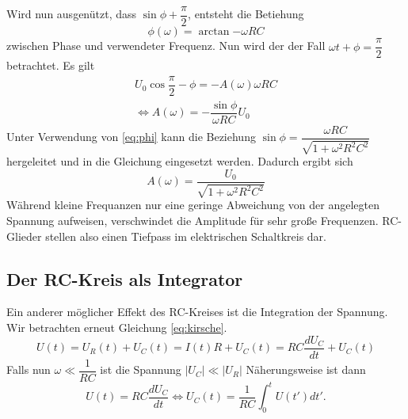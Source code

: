     Wird nun ausgenützt, dass $\sin{\phi + \dfrac{\pi}{2}}$, entsteht die Betiehung
    \begin{equation}
        \label{eq:phi}
        \phi(\omega)=\arctan{-\omega RC}
    \end{equation}
    zwischen Phase und verwendeter Frequenz. Nun wird der der Fall $\omega t + \phi = 
    \dfrac{\pi}{2}$ betrachtet. Es gilt
    \begin{align*}
        U_0 \cos{\dfrac{\pi}{2}-\phi}=-A(\omega)\omega RC\\
        \Leftrightarrow A(\omega)=-\dfrac{\sin{\phi}}{\omega RC}U_0
    \end{align*}
    Unter Verwendung von \ref{eq:phi} kann die Beziehung $\sin{\phi}=\dfrac{\omega RC}
    {\sqrt{1+\omega^2 R^2 C^2}}$ hergeleitet und in die Gleichung eingesetzt werden.
    Dadurch ergibt sich 
    \begin{equation}
        A(\omega)=\dfrac{U_0}{\sqrt{1+\omega^2 R^2 C^2}}
    \end{equation}
    Während kleine Frequanzen nur eine geringe Abweichung von der angelegten Spannung
    aufweisen, verschwindet die Amplitude für sehr große Frequenzen.
    RC-Glieder stellen also einen Tiefpass im elektrischen Schaltkreis dar.

\subsection{Der RC-Kreis als Integrator}
    Ein anderer möglicher Effekt des RC-Kreises ist die Integration der Spannung. Wir betrachten 
    erneut Gleichung \ref{eq:kirsche}.
    \begin{equation*}
        U(t)=U_R(t)+U_C(t)=I(t)R+U_C(t)=RC\dfrac{dU_C}{dt}+U_C(t)
    \end{equation*} 
    Falls nun $\omega \ll \dfrac{1}{RC}$ ist die Spannung $\vert U_C \vert \ll \vert U_R \vert$
    Näherungsweise ist dann 
    \begin{equation}
        U(t)=RC\dfrac{dU_C}{dt} \Leftrightarrow U_C(t)=\dfrac{1}{RC}\int_0^t U(t')dt'.
    \end{equation}
